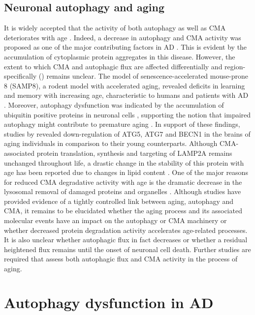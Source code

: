 \subsection{Neuronal autophagy and aging}
It is widely accepted that the activity of both autophagy as well as CMA deteriorates with age \citep{Cuervo2005}. Indeed, a decrease in autophagy and CMA activity was proposed as one of the major contributing factors in AD \citep{Cuervo2005}. This is evident by the accumulation of cytoplasmic protein aggregates in this disease. However, the extent to which CMA and autophagic flux are affected differentially and region-specifically () remains unclear. The model of senescence-accelerated mouse-prone 8 (SAMP8), a rodent model with accelerated aging, revealed deficits in learning and memory with increasing age, characteristic to humans and patients with AD \citep{Ma2011}. Moreover, autophagy dysfunction was indicated by the accumulation of ubiquitin positive proteins in neuronal cells \citep{Ma2011}, supporting the notion that impaired autophagy might contribute to premature aging \citep{Vellai2003}. In support of these findings, studies by \citet{Lipinski2010} revealed down-regulation of ATG5, ATG7 and BECN1 in the brains of aging individuals in comparison to their young counterparts. Although CMA-associated protein translation, synthesis and targeting of LAMP2A remains unchanged throughout life, a drastic change in the stability of this protein with age has been reported due to changes in lipid content \citep{Cuervo2014}. One of the major reasons for reduced CMA degradative activity with age is the dramatic decrease in the lysosomal removal of damaged proteins and organelles \citep{Massey2006}. Although studies have provided evidence of a tightly controlled link between aging, autophagy and CMA, it remains to be elucidated whether the aging process and its associated molecular events have an impact on the autophagy or CMA machinery or whether decreased protein degradation activity accelerates age-related processes. It is also unclear whether autophagic flux in fact decreases or whether a residual heightened flux remains until the onset of neuronal cell death. Further studies are required that assess both autophagic flux and CMA activity in the process of aging. 

\section{Autophagy dysfunction in AD}
